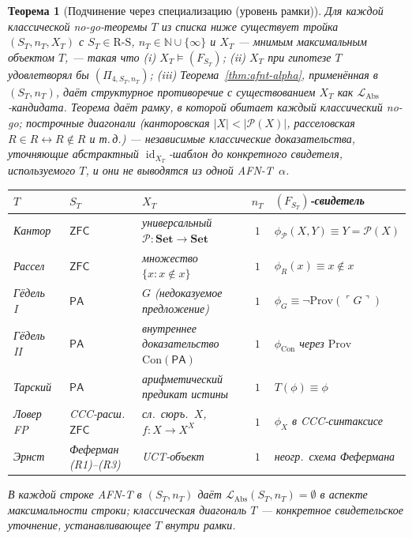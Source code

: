 \documentclass[11pt]{article}
\theoremstyle{plain}
\newtheorem{theorem}{Теорема}[section]
\theoremstyle{definition}
\newcommand{\RS}{\mathrm{R\text{-}S}}
\newcommand{\cP}{\mathcal{P}}
\newcommand{\LAbs}{\mathcal{L}_{\mathrm{Abs}}}
\newcommand{\ZFC}{\mathsf{ZFC}}
\DeclareMathOperator{\id}{id}
\begin{document}
\begin{theorem}[Подчинение через специализацию (уровень рамки)]\label{thm:subsumption}
Для каждой классической no-go-теоремы $T$ из списка ниже существует тройка $(S_T, n_T, X_T)$ с $S_T \in \RS$, $n_T \in \mathbb{N} \cup \{\infty\}$ и $X_T$ — мнимым максимальным объектом $T$, — такая что (i) $X_T \models (F_{S_T})$; (ii) $X_T$ при гипотезе $T$ удовлетворял бы $(\Pi_{4, S_T, n_T})$; (iii) Теорема~\ref{thm:afnt-alpha}, применённая в $(S_T, n_T)$, даёт структурное противоречие с существованием $X_T$ как $\LAbs$-кандидата. Теорема даёт \emph{рамку}, в которой обитает каждый классический no-go; построчные диагонали (канторовская $|X|<|\cP(X)|$, расселовская $R \in R \leftrightarrow R \notin R$ и т.\,д.) — независимые классические доказательства, уточняющие абстрактный $\id_{X_T}$-шаблон до конкретного свидетеля, используемого $T$, и они не выводятся из одной AFN-T~$\alpha$.
\begin{center}\footnotesize
\begin{tabular}{@{}lllcl@{}}
\toprule
$T$ & $S_T$ & $X_T$ & $n_T$ & $(F_{S_T})$-свидетель \\ \midrule
Кантор~\cite{Cantor1891} & $\ZFC$ & универсальный $\cP : \mathbf{Set} \to \mathbf{Set}$ & $1$ & $\phi_{\cP}(X,Y) \equiv Y = \cP(X)$ \\
Рассел~\cite{Russell1903} & $\ZFC$ & множество $\{x : x \notin x\}$ & $1$ & $\phi_R(x) \equiv x \notin x$ \\
Гёдель I~\cite{Godel1931} & $\mathsf{PA}$ & $G$ (недоказуемое предложение) & $1$ & $\phi_G \equiv \neg \mathrm{Prov}(\ulcorner G \urcorner)$ \\
Гёдель II~\cite{Godel1931} & $\mathsf{PA}$ & внутреннее доказательство $\mathrm{Con}(\mathsf{PA})$ & $1$ & $\phi_{\mathrm{Con}}$ через $\mathrm{Prov}$ \\
Тарский~\cite{Tarski1936} & $\mathsf{PA}$ & арифметический предикат истины & $1$ & $T(\phi) \equiv \phi$ \\
Ловер FP~\cite{Lawvere1969} & CCC-расш.\ $\ZFC$ & сл.\ сюръ.\ $X$, $f:X \to X^X$ & $1$ & $\phi_X$ в CCC-синтаксисе \\
Эрнст~\cite{Ernst2015} & Феферман (R1)--(R3) & UCT-объект & $1$ & неогр.\ схема Фефермана \\
\bottomrule
\end{tabular}
\end{center}
В каждой строке AFN-T в $(S_T, n_T)$ даёт $\LAbs(S_T, n_T) = \emptyset$ в аспекте максимальности строки; классическая диагональ $T$ — конкретное свидетельское уточнение, устанавливающее $T$ внутри рамки.
\end{theorem}
\end{document}
